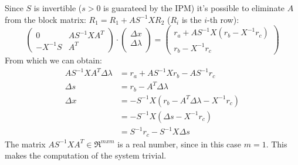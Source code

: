 \documentclass[]{article}
\begin{document}
Since $S$ is invertible ($s > 0$ is guarateed by the IPM) it's possible to eliminate $A$ from the block matrix: $R_1 = R_1 +AS^{-1}XR_2$ ($R_i$ is the $i$-th row):
\begin{equation*}
\begin{pmatrix}
0 & AS^{-1}XA^T\\
-X^{-1}S & A^T
\end{pmatrix}
\cdot
\begin{pmatrix}
\Delta x \\[0.3em]
\Delta \lambda \\[0.3em]
\end{pmatrix}
=
\begin{pmatrix}
r_a + AS^{-1}X(r_b-X^{-1}r_c)\\
r_b-X^{-1}r_c
\end{pmatrix}
\end{equation*}
From which we can obtain:
\begin{equation*}
	\begin{split}
	AS^{-1}XA^T\Delta\lambda&=r_a+AS^{-1}Xr_b-AS^{-1}r_c\\
	\Delta s &= r_b-A^T\Delta \lambda\\
	\Delta x &=-S^{-1}X(r_b-A^T\Delta \lambda - X^{-1}r_c)\\
	&=-S^{-1}X(\Delta s - X^{-1}r_c)\\
	&= S^{-1}r_c-S^{-1}X\Delta s
	\end{split}
\end{equation*}
The matrix $AS^{-1}XA^T \in \Re^{mxm}$ is a real number, since in this case $m=1$. This makes the computation of the system trivial.
\pagebreak
\end{document}
